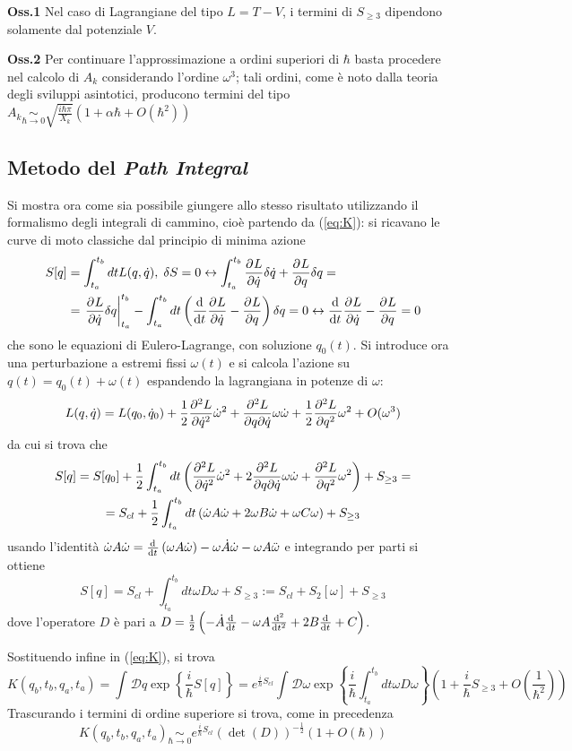 \textbf{Oss.1} Nel caso di Lagrangiane del tipo $L=T-V$, i termini di $S_{\geq3}$ dipendono
solamente dal potenziale $V$.

\textbf{Oss.2} Per continuare l'approssimazione a ordini superiori di $\hbar$ basta procedere nel
calcolo di $A_k$ considerando l'ordine $\omega^3$; tali ordini, come è noto dalla teoria degli
sviluppi asintotici, producono termini del tipo
$A_k \underset{\hbar\to0}\sim\sqrt{\frac{i\hbar\pi}{X_k}}(1+\alpha\hbar + O(\hbar^2))$ 
\subsection{Metodo del \textit{Path Integral}}
Si mostra ora come sia possibile giungere allo stesso risultato utilizzando il formalismo degli
integrali di cammino, cioè partendo da (\ref{eq:K}): si ricavano le curve di moto classiche dal
principio di minima azione
\begin{align*}
S[q] &= \int_{t_a}^{t_b}dtL(q,\dot q),\;\delta S = 0 \leftrightarrow
\int_{t_a}^{t_b}\pdv[]{L}{\dot q}\delta\dot q + \pdv[]{L}{q}\delta q =\\
&=\eval{\pdv[]{L}{\dot q}\delta q}_{t_a}^{t_b}-\int_{t_a}^{t_b}dt\left(\dv[]{}{t}\pdv[]{L}{\dot q}-
\pdv[]{L}{q}\right)\delta q = 0 \leftrightarrow \dv[]{}{t}\pdv[]{L}{\dot q}-\pdv[]{L}{q}=0
\end{align*}
che sono le equazioni di Eulero-Lagrange, con soluzione $q_0(t)$. Si introduce ora una perturbazione
a estremi fissi $\omega(t)$ e si calcola l'azione su $q(t) = q_0(t)+\omega(t)$ espandendo la
lagrangiana in potenze di $\omega$:
$$L(q,\dot q) = L(q_0,\dot q_0) + \frac{1}{2}\pdv[2]{L}{\dot q}\dot\omega^2+\pdv{L}{q}{\dot q}\omega
\dot\omega + \frac{1}{2}\pdv[2]{L}{q}\omega^2 + O(\omega^3)$$
da cui si trova che
\begin{gather*}
S[q] = S[q_0]+\frac{1}{2}\int_{t_a}^{t_b}dt\left(\pdv[2]{L}{\dot q}\dot\omega^2+2\pdv{L}{q}{\dot q}
\omega\dot\omega +\pdv[2]{L}{q}\omega^2\right)+ S_{\geq3}=\\
=S_{cl}+\frac{1}{2}\int_{t_a}^{t_b}dt\left(\dot\omega A\dot\omega+2\omega B\dot\omega+\omega C\omega
\right)+S_{\geq3}
\end{gather*}
usando l'identità $\dot\omega A\dot\omega=\dv[]{}{t}\left(\omega A\dot\omega\right)-
\omega\dot A\dot\omega-\omega A\ddot\omega$ e integrando per parti si ottiene
$$S[q]=S_{cl}+\int_{t_a}^{t_b}dt\omega D\omega +S_{\geq3} := S_{cl}+S_2[\omega]+S_{\geq3}$$
dove l'operatore $D$ è pari a $D=\frac12\left(-\dot A \dv[]{}{t}-\omega A \dv[2]{}{t}+2B\dv[]{}{t}+C\right)$.

Sostituendo infine in (\ref{eq:K}), si trova
$$K(q_b,t_b,q_a,t_a) = \int_{}^{}\mathcal{D}q \exp\left\{\frac{i}{\hbar}S[q]\right\} = 
e^{\frac{i}{\hbar}S_{cl}}\int_{}^{}\mathcal{D}\omega \exp\left\{\frac{i}{\hbar}\int_{t_a}^{t_b}dt
\omega D\omega\right\}
\left(1+\frac{i}{\hbar}S_{\geq3}+O\left(\frac{1}{\hbar^2}\right)\right)$$
Trascurando i termini di ordine superiore si trova, come in precedenza
$$\boxed{K(q_b,t_b,q_a,t_a)\underset{\hbar\to0}\sim e^{\frac{i}{\hbar}S_{cl}}
(\det(D))^{-\frac{1}{2}}(1+O(\hbar))}$$
